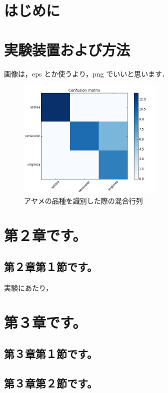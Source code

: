 \documentclass[a4jsme]{jsmepaper}
\date{\today}
\begin{document}
\maketitle
\thispagestyle{fancy}

\section*{はじめに}
\section{実験装置および方法}

画像は，eps とか使うより，png でいいと思います．
\begin{figure}[htbp]
  \begin{center}
    \includegraphics[width=7cm]{img/iris_confusion_matrix.png}
    \caption{アヤメの品種を識別した際の混合行列}
    \label{fig:one}
  \end{center}
\end{figure}

\section{第２章です。}
\subsection{第２章第１節です。\\}

実験にあたり，
\section{第３章です。}
\subsection{第３章第１節です。}
\subsection{第３章第２節です。}
\end{document}
